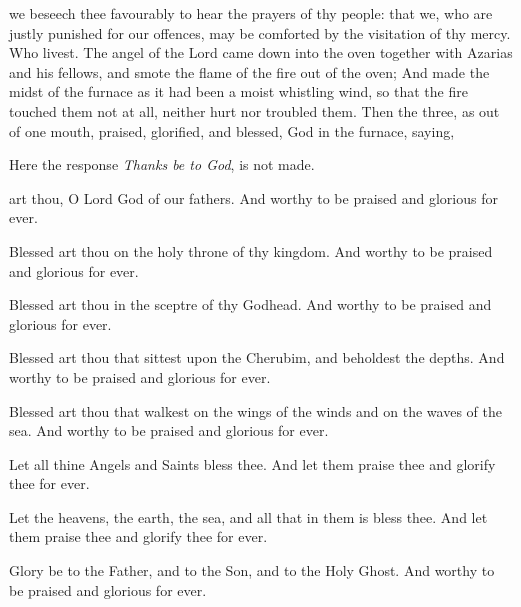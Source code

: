\collect
{} we beseech thee favourably to hear the prayers of thy people: that we, who are justly punished for our offences, may be comforted by the visitation of thy mercy. Who livest.
 The angel of the Lord came down into the oven together with Azarias and his fellows, and smote the flame of the fire out of the oven; And made the midst of the furnace as it had been a moist whistling wind, so that the fire touched them not at all, neither hurt nor troubled them. Then the three, as out of one mouth, praised, glorified, and blessed, God in the furnace, saying,
\begin{rubric}
    Here the response \emph{Thanks be to God}, is not made.
\end{rubric}
 art thou, O Lord God of our fathers. And worthy to be praised and glorious for ever.\par
{}

Blessed art thou on the holy throne of thy kingdom. And worthy to be praised and glorious for ever.

Blessed art thou in the sceptre of thy Godhead. And worthy to be praised and glorious for ever.

Blessed art thou that sittest upon the Cherubim, and beholdest the depths. And worthy to be praised and glorious for ever.

Blessed art thou that walkest on the wings of the winds and on the waves of the sea. And worthy to be praised and glorious for ever.

Let all thine Angels and Saints bless thee. And let them praise thee and glorify thee for ever.

Let the heavens, the earth, the sea, and all that in them is bless thee. And let them praise thee and glorify thee for ever.

Glory be to the Father, and to the Son, and to the Holy Ghost. And worthy to be praised and glorious for ever.

